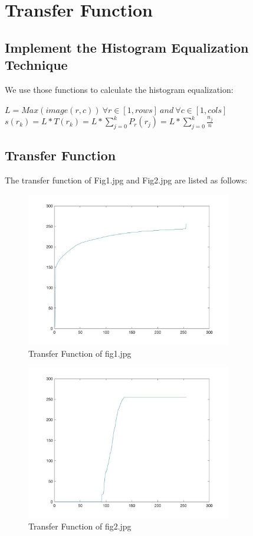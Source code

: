 \documentclass[11pt,oneside]{book}
\begin{document}
\section{Transfer Function}
\subsection{Implement the Histogram Equalization Technique}
We use those functions to calculate the histogram equalization:\\
\begin{center}
$L=Max(image(r,c))\ \forall r \in [1,rows]\ and\ \forall c \in [1,cols]$\\
$s(r_k) = L*T(r_k) = L*\sum_{j=0}^kP_r(r_j)=L*\sum_{j=0}^k\frac{n_j}{n}$
\end{center}
\newpage
\subsection{Transfer Function}
The transfer function of Fig1.jpg and Fig2.jpg are listed as follows:
\begin{figure}[!htb]
   \centering  
   \includegraphics[width=0.8\textwidth]{images/1/transfer_f1.jpg}
   \caption{Transfer Function of fig1.jpg}  
\end{figure}
\begin{figure}[!htb]
   \centering  
   \includegraphics[width=0.8\textwidth]{images/1/transfer_f2.jpg}
   \caption{Transfer Function of fig2.jpg}  
\end{figure}
\end{document}
